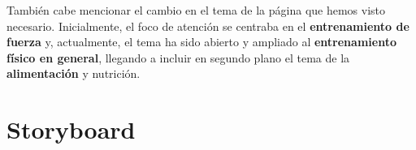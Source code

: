 \documentclass[a4paper]{article}
\begin{document}
También cabe mencionar el cambio en el tema de la página que hemos visto necesario. Inicialmente, el foco de atención se centraba en el \textbf{entrenamiento de fuerza} y, actualmente, el tema ha sido abierto y ampliado al \textbf{entrenamiento físico en general}, llegando a incluir en segundo plano el tema de la \textbf{alimentación} y nutrición.

\FloatBarrier
\section{Storyboard}
\end{document}
